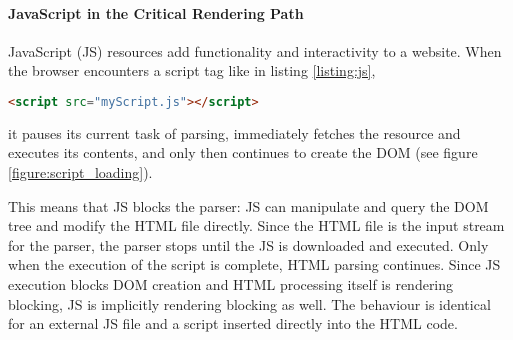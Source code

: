 



\paragraph{JavaScript in the Critical Rendering Path} %


JavaScript (JS) resources add functionality and interactivity to a website.
When the browser encounters a script tag like in listing \ref{listing:js},

\begin{center}
\begin{lstlisting}[caption={Link to a JS file from the main document}, label={listing:js}, language=html, numbers=none]
<script src="myScript.js"></script>
\end{lstlisting}
\end{center}

it pauses its current task of parsing, immediately fetches the resource and executes its contents, and only then continues to create the DOM (see figure \ref{figure:script_loading}). %

This means that JS blocks the parser: JS can manipulate and query the DOM tree and modify the HTML file directly.
Since the HTML file is the input stream for the parser, the parser stops until the JS is downloaded and executed. %
Only when the execution of the script is complete, HTML parsing continues.
Since JS execution blocks DOM creation and HTML processing itself is rendering blocking, JS is implicitly rendering blocking as well. %
The behaviour is identical for an external JS file and a script inserted directly into the HTML code.


